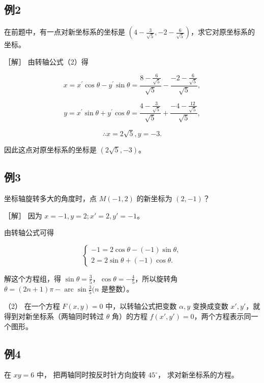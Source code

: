 \subsection{例2}\label{ux4f8b2-33}

在前题中，有一点对新坐标系的坐标是
\(\left(4 - \frac{3}{\sqrt{5}}, -2 - \frac{6}{\sqrt{5}}\right)\)，求它对原坐标系的坐标。

［解］ 由转轴公式（2）得

\[
x = x^{\prime} \cos \theta - y^{\prime} \sin \theta = \frac {8 - \frac {6}{\sqrt {5}}}{\sqrt {5}} - \frac {- 2 - \frac {6}{\sqrt {5}}}{\sqrt {5}},
\]

\[
y = x^{\prime} \sin \theta + y^{\prime} \cos \theta = \frac {4 - \frac {3}{\sqrt {5}}}{\sqrt {5}} + \frac {- 4 - \frac {12}{\sqrt {5}}}{\sqrt {5}},
\]

\[
\therefore x = 2 \sqrt {5}, y = - 3.
\]

因此这点对原坐标系的坐标是 \((2\sqrt{5}, -3)\)。

\subsection{例3}\label{ux4f8b3-23}

坐标轴旋转多大的角度时，点 \(M(-1,2)\) 的新坐标为 \((2,-1)\)？

［解］ 因为 \(x = -1, y = 2; x' = 2, y' = -1\)。

由转轴公式可得

\[
\left\{ \begin{array}{l} - 1 = 2 \cos \theta - (- 1) \sin \theta, \\ 2 = 2 \sin \theta + (- 1) \cos \theta. \end{array} \right.
\]

解这个方程组，得
\(\sin \theta = \frac{3}{5}\)，\(\cos \theta = -\frac{4}{5}\)，所以旋转角
\(\theta = (2n + 1)\pi -\operatorname {arc}\sin \frac{3}{5} (n\)
是整数）。

（2） 在一个方程 \(F(x, y) = 0\) 中，以转轴公式把变数 \(\alpha, y\)
变换成变数 \(x', y'\)，就得到对新坐标系（两轴同时转过 \(\theta\)
角）的方程 \(f(x', y') = 0\)，两个方程表示同一个图形。

\subsection{例4}\label{ux4f8b4-16}

在 \(xy = 6\) 中， 把两轴同时按反时针方向旋转 \(45^{\circ}\)，
求对新坐标系的方程。

